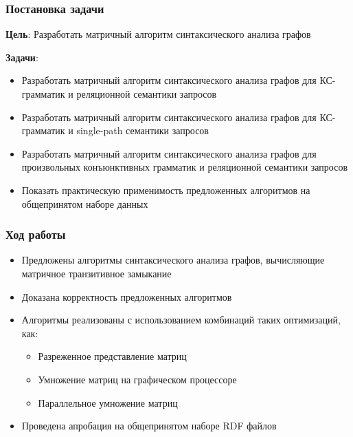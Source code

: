 \documentclass{beamer}
\begin{document}
\begin{frame}[fragile]
\transwipe[direction=90]
\frametitle{Постановка задачи}
\textbf{Цель}: Разработать матричный алгоритм синтаксического анализа графов

\textbf{Задачи}:
\begin{itemize}
	\item Разработать матричный алгоритм синтаксического анализа графов для КС-грамматик и реляционной семантики запросов
	\item Разработать матричный алгоритм синтаксического анализа графов для КС-грамматик и single-path семантики запросов
	\item Разработать матричный алгоритм синтаксического анализа графов для произвольных конъюнктивных грамматик и реляционной семантики запросов
	\item Показать практическую применимость предложенных алгоритмов на общепринятом наборе данных
\end{itemize}
\end{frame}

\begin{frame}[fragile]
	\transwipe[direction=90]
	\frametitle{Ход работы}
	\begin{itemize}
	   \item Предложены алгоритмы синтаксического анализа графов, вычисляющие матричное транзитивное замыкание
	   \item Доказана корректность предложенных алгоритмов
	   \item Алгоритмы реализованы с использованием комбинаций таких оптимизаций, как:
	   \begin{itemize}
	    \item Разреженное представление матриц
	    \item Умножение матриц на графическом процессоре
	    \item Параллельное умножение матриц
	   \end{itemize}
	   \item Проведена апробация на общепринятом наборе RDF файлов
    \end{itemize}
\end{frame}
\end{document}
